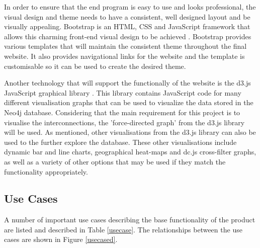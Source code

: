 \documentclass[12pt,onecolumn]{article}
\begin{document}
	In order to ensure that the end program is easy to use and looks professional, the visual design and theme needs to have a consistent, well designed layout and be visually appealing. Bootstrap is an HTML, CSS and JavaScript framework that allows this charming front-end visual design to be achieved \cite{Bootstrap}. Bootstrap provides various templates that will maintain the consistent theme throughout the final website. It also provides navigational links for the website and the template is customisable so it can be used to create the desired theme.

	Another technology that will support the functionally of the website is the d3.js JavaScript graphical library \cite{D3}. This library contains JavaScript code for many different visualisation graphs that can be used to visualize the data stored in the Neo4j database. Considering that the main requirement for this project is to visualise the interconnections, the 'force-directed graph' from the d3.js library will be used. As mentioned, other visualisations from the d3.js library can also be used to the further explore the database. These other visualisations include dynamic bar and line charts, geographical heat-maps and dc.js cross-filter graphs, as well as a variety of other options that may be used if they match the functionality appropriately.

	\subsection{Use Cases}
	A number of important use cases describing the base functionality of the product are listed and described in Table \ref{usecase}. The relationships between the use cases are shown in Figure \ref{usecased}.
\end{document}
